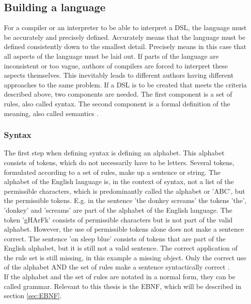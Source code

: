 \subsection{Building a language}
For a compiler or an interpreter to be able to interpret a \ac{DSL}, the language must be accurately and precisely defined. Accurately means that the language must be defined consistently down to the smallest detail. Precisely means in this case that all aspects of the language must be laid out. If parts of the language are inconsistent or too vague, authors of compilers are forced to interpret these aspects themselves. This inevitably leads to different authors having different approaches to the same problem. If a \ac{DSL} is to be created that meets the criteria described above, two components are needed. The first component is a set of rules, also called syntax. The second component is a formal definition of the meaning, also called semantics \parencite[cf.][p. 2]{farrell_compiler_1995}.
\subsubsection{Syntax}
The first step when defining syntax is defining an alphabet. This alphabet consists of tokens, which do not necessarily have to be letters. Several tokens, formulated according to a set of rules, make up a sentence or string. The alphabet of the English language is, in the context of syntax, not a list of the permissible characters, which is predominantly called the alphabet or 'ABC', but the permissible tokens.
E.g. in the sentence 'the donkey screams' the tokens 'the', 'donkey' and 'screams' are part of the alphabet of the English language. The token 'gHArFk' consists of permissible characters but is not part of the valid alphabet. However, the use of permissible tokens alone does not make a sentence correct. The sentence 'on sleep blue' consists of tokens that are part of the English alphabet, but it is still not a valid sentence. The correct application of the rule set is still missing, in this example a missing object. Only the correct use of the alphabet AND the set of rules make a sentence syntactically correct \parencite[cf.][p. 2]{farrell_compiler_1995}.\\
If the alphabet and the set of rules are notated in a normal form, they can be called grammar. Relevant to this thesis is the \ac{EBNF}, which will be described in section \ref{sec:EBNF}.
